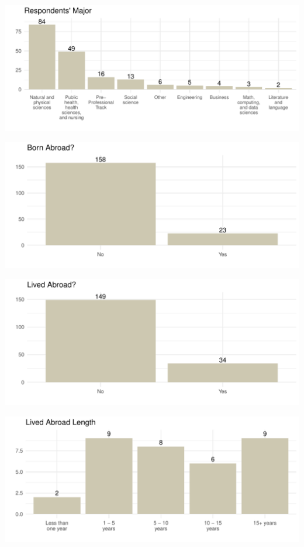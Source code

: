 \documentclass[
  letterpaper,
  DIV=11,
  numbers=noendperiod]{scrartcl}
\begin{document}
\includegraphics{GlobalHealthQuarto1-5_files/figure-pdf/unnamed-chunk-8-1.pdf}

\includegraphics{GlobalHealthQuarto1-5_files/figure-pdf/unnamed-chunk-9-1.pdf}

\includegraphics{GlobalHealthQuarto1-5_files/figure-pdf/unnamed-chunk-10-1.pdf}

\includegraphics{GlobalHealthQuarto1-5_files/figure-pdf/unnamed-chunk-11-1.pdf}
\end{document}
